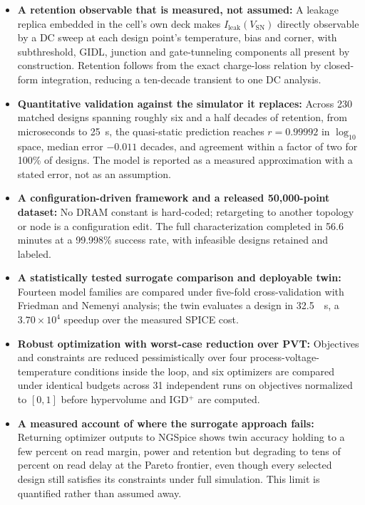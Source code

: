 \documentclass[11pt,a4paper]{article}
\newcommand{\Vsn}{V_{\mathrm{SN}}}
\newcommand{\Ileak}{I_{\mathrm{leak}}}
\begin{document}
\begin{itemize}
\item \textbf{A retention observable that is measured, not assumed:} A leakage
replica embedded in the cell's own deck makes $\Ileak(\Vsn)$ directly observable
by a DC sweep at each design point's temperature, bias and corner, with
subthreshold, GIDL, junction and gate-tunneling components all present by
construction. Retention follows from the exact charge-loss relation by
closed-form integration, reducing a ten-decade transient to one DC analysis.

\item \textbf{Quantitative validation against the simulator it replaces:} Across
230 matched designs spanning roughly six and a half decades of retention, from
microseconds to \SI{25}{\second}, the quasi-static prediction reaches
$r=0.99992$ in $\log_{10}$ space, median error $-0.011$ decades, and agreement
within a factor of two for 100\% of designs. The model is reported as a measured
approximation with a stated error, not as an assumption.

\item \textbf{A configuration-driven framework and a released 50,000-point
dataset:} No DRAM constant is hard-coded; retargeting to another topology or node
is a configuration edit. The full characterization completed in 56.6 minutes at a
99.998\% success rate, with infeasible designs retained and labeled.

\item \textbf{A statistically tested surrogate comparison and deployable twin:}
Fourteen model families are compared under five-fold cross-validation with
Friedman and Nemenyi analysis; the twin evaluates a design in \SI{32.5}{\micro
\second}, a $3.70\times10^{4}$ speedup over the measured SPICE cost.

\item \textbf{Robust optimization with worst-case reduction over PVT:} Objectives
and constraints are reduced pessimistically over four process-voltage-temperature
conditions inside the loop, and six optimizers are compared under identical budgets
across 31 independent runs on objectives normalized to $[0,1]$ before hypervolume
and IGD$^{+}$ are computed.

\item \textbf{A measured account of where the surrogate approach fails:}
Returning optimizer outputs to NGSpice shows twin accuracy holding to a few percent
on read margin, power and retention but degrading to tens of percent on read delay
at the Pareto frontier, even though
every selected design still satisfies its constraints under full simulation. This
limit is quantified rather than assumed away.
\end{itemize}
\end{document}
